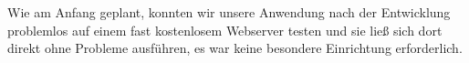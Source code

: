 Wie am Anfang geplant, konnten wir unsere Anwendung nach der Entwicklung problemlos auf einem fast kostenlosem Webserver testen und sie ließ sich dort direkt ohne Probleme ausführen, es war keine besondere Einrichtung erforderlich. 




